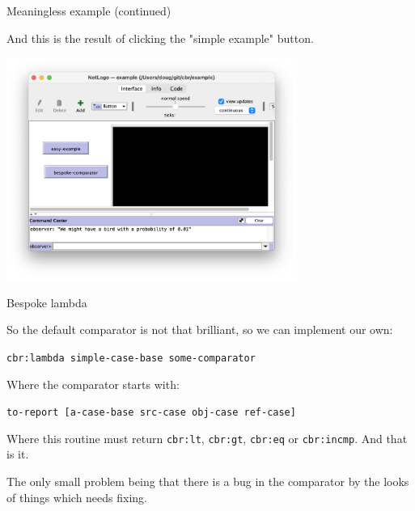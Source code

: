 \documentclass[usenames,dvipsnames,10pt]{beamer} %
\begin{document}
\begin{frame}{Meaningless example (continued)}

    And this is the result of clicking the "simple example" button.

    \includegraphics[width=9.5cm]{img/simple-example-result.png}

\end{frame}

\begin{frame}{Bespoke lambda}

    So the default comparator is not that brilliant, so we can implement our
    own:
    \vspace{0.5cm}

    \small
    \texttt{{\color{blue}cbr:lambda} simple-case-base some-comparator}

    \vspace{0.5cm}

    \normalsize

    Where the comparator starts with:

    \small
    \texttt{to-report [a-case-base src-case obj-case ref-case]}

    \vspace{0.5cm}

    \normalsize

    Where this routine must return \texttt{\color{blue}cbr:lt},
    \texttt{\color{blue}cbr:gt}, \texttt{\color{blue}cbr:eq} or
    \texttt{\color{blue}cbr:incmp}.  And that is it.

    \vspace{0.5cm}

    The only small problem being that there is a bug in the comparator by the
    looks of things which needs fixing.


\end{frame}
\end{document}
